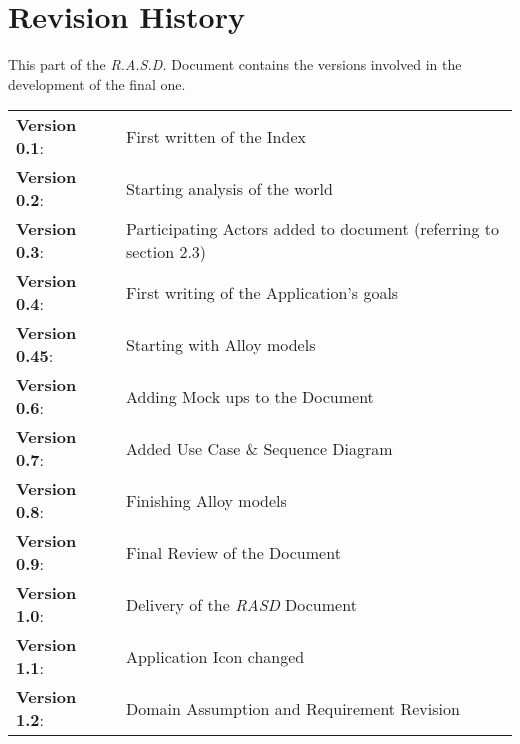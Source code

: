 \section{Revision History}

This part of the \emph{R.A.S.D.} Document contains the versions involved in the development of the final one.

\vspace{10pt}

\begin{tabular}{l l}

	\textbf{Version 0.1}:           & First written of the Index \\
    
    \textbf{Version 0.2}:           & Starting analysis of the world \\

	\textbf{Version 0.3}:           & Participating Actors added to document (referring to section 2.3)\\
    
    \textbf{Version 0.4}:           & First writing of the Application's goals\\
    
    \textbf{Version 0.45}:          & Starting with Alloy models \\
    
    \textbf{Version 0.6}:           & Adding Mock ups to the Document \\
    
    \textbf{Version 0.7}:           & Added Use Case \& Sequence Diagram \\
    
    \textbf{Version 0.8}:           & Finishing Alloy models\\
    
    \textbf{Version 0.9}:           & Final Review of the Document \\
    
    \large{\textbf{Version 1.0}}:   & Delivery of the \emph{RASD} Document \\
    
    \textbf{Version 1.1}:           & Application Icon changed \\

    \textbf{Version 1.2}:           & Domain Assumption and Requirement Revision \\

\end{tabular}